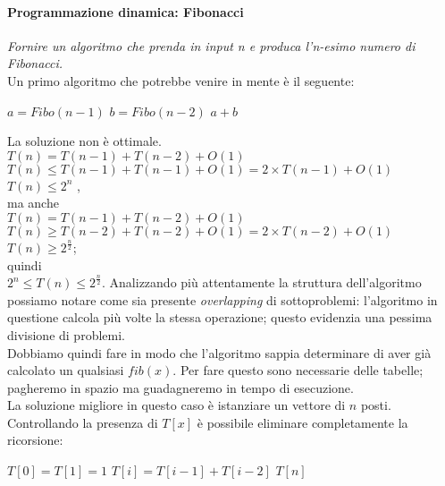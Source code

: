 \paragraph{Programmazione dinamica: Fibonacci} \textit{Fornire un algoritmo che prenda in input n e produca l'n-esimo numero di Fibonacci.}\\
Un primo algoritmo che potrebbe venire in mente è il seguente:
\begin{algorithmic}
		\EndIf
		\State $ a = Fibo(n-1) $
		\State $ b = Fibo(n-2) $
		\State \Return $ a+b $
	\EndFunction
\end{algorithmic}
La soluzione non è ottimale.\\
$ T(n) = T(n-1)+T(n-2)+ O(1) $\\
$ T(n) \le T(n-1) + T(n-1) + O(1)  = 2 \times T(n-1) + O(1)$\\
$ T(n) \le 2^{n} $ ,\\
ma anche\\
$ T(n) = T(n-1)+T(n-2)+ O(1) $\\
$ T(n) \ge T(n-2) + T(n-2) + O(1)  = 2 \times T(n-2) + O(1)$\\
$ T(n) \ge 2^{\frac{n}{2}}$;\\
quindi\\
$ 2^{n} \le T(n) \le 2^{\frac{n}{2}}$.
Analizzando più attentamente la struttura dell'algoritmo possiamo notare come sia presente \textit{overlapping} di sottoproblemi: l'algoritmo in questione calcola più volte la stessa operazione; questo evidenzia una pessima divisione di problemi.\\
Dobbiamo quindi fare in modo che l'algoritmo sappia determinare di aver già calcolato un qualsiasi $ fib(x) $. Per fare questo sono necessarie delle tabelle; pagheremo in spazio ma guadagneremo in tempo di esecuzione.\\
La soluzione migliore in questo caso è istanziare un vettore di $ n $ posti. Controllando la presenza di $ T[x] $ è possibile eliminare completamente la ricorsione:
\begin{algorithmic}
		\State $ T[0] = T[1] = 1 $
			\State $ T[i] = T[i-1] + T[i-2] $
		\EndFor
		\Return $ T[n] $
	\EndFunction
\end{algorithmic}

